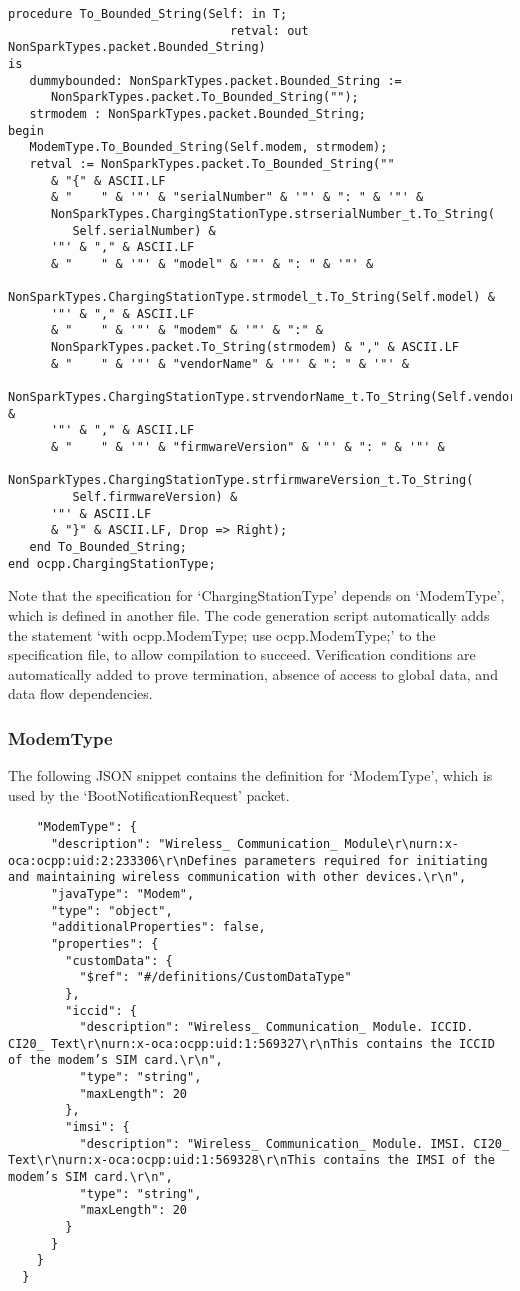 \documentclass[12pt,openany,a4paper]{book}
\begin{document}
\begin{verbatim}
procedure To_Bounded_String(Self: in T;
                               retval: out NonSparkTypes.packet.Bounded_String)
is
   dummybounded: NonSparkTypes.packet.Bounded_String := 
      NonSparkTypes.packet.To_Bounded_String(""); 
   strmodem : NonSparkTypes.packet.Bounded_String;
begin
   ModemType.To_Bounded_String(Self.modem, strmodem);
   retval := NonSparkTypes.packet.To_Bounded_String(""
      & "{" & ASCII.LF
      & "    " & '"' & "serialNumber" & '"' & ": " & '"' &
      NonSparkTypes.ChargingStationType.strserialNumber_t.To_String(
         Self.serialNumber) & 
      '"' & "," & ASCII.LF                                                      
      & "    " & '"' & "model" & '"' & ": " & '"' &
      NonSparkTypes.ChargingStationType.strmodel_t.To_String(Self.model) & 
      '"' & "," & ASCII.LF
      & "    " & '"' & "modem" & '"' & ":" & 
      NonSparkTypes.packet.To_String(strmodem) & "," & ASCII.LF 
      & "    " & '"' & "vendorName" & '"' & ": " & '"' &
      NonSparkTypes.ChargingStationType.strvendorName_t.To_String(Self.vendorName) & 
      '"' & "," & ASCII.LF
      & "    " & '"' & "firmwareVersion" & '"' & ": " & '"' &
      NonSparkTypes.ChargingStationType.strfirmwareVersion_t.To_String(
         Self.firmwareVersion) & 
      '"' & ASCII.LF
      & "}" & ASCII.LF, Drop => Right);
   end To_Bounded_String;
end ocpp.ChargingStationType;
\end{verbatim}
Note that the specification for `ChargingStationType' depends on `ModemType', which is defined in another file. The code generation script automatically adds the statement `with ocpp.ModemType; use ocpp.ModemType;' to the specification file, to allow compilation to succeed. Verification conditions are automatically added to prove termination, absence of access to global data, and data flow dependencies.

\subsubsection{ModemType}
The following JSON snippet contains the definition for `ModemType', which is used by the `BootNotificationRequest' packet.

\begin{verbatim}
    "ModemType": {
      "description": "Wireless_ Communication_ Module\r\nurn:x-oca:ocpp:uid:2:233306\r\nDefines parameters required for initiating and maintaining wireless communication with other devices.\r\n",
      "javaType": "Modem",
      "type": "object",
      "additionalProperties": false,
      "properties": {
        "customData": {
          "$ref": "#/definitions/CustomDataType"
        },
        "iccid": {
          "description": "Wireless_ Communication_ Module. ICCID. CI20_ Text\r\nurn:x-oca:ocpp:uid:1:569327\r\nThis contains the ICCID of the modem’s SIM card.\r\n",
          "type": "string",
          "maxLength": 20
        },
        "imsi": {
          "description": "Wireless_ Communication_ Module. IMSI. CI20_ Text\r\nurn:x-oca:ocpp:uid:1:569328\r\nThis contains the IMSI of the modem’s SIM card.\r\n",
          "type": "string",
          "maxLength": 20
        }
      }
    }
  }
\end{verbatim}
\end{document}
